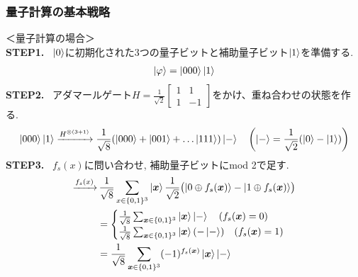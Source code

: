 \documentclass[9pt]{beamer}
\begin{document}
\begin{frame}
    \frametitle{量子計算の基本戦略}
    ＜量子計算の場合＞\\
    \textbf{STEP1.} \, $\ket{0}$に初期化された3つの量子ビットと補助量子ビット$\ket{1}$を準備する.
    \begin{align}
        \ket{\varphi} = \ket{000}\ket{1}
    \end{align}
    \textbf{STEP2.} \, アダマールゲート$H =\frac{1}{\sqrt{2}} \begin{bmatrix}1 & 1 \\ 1 & -1 \end{bmatrix}$をかけ、重ね合わせの状態を作る.
    \begin{align}
        \ket{000}\ket{1} \xrightarrow{H^{\otimes(3+1)}} \frac{1}{\sqrt{8}}(\ket{000} + \ket{001} + \ldots \ket{111}) \ket{-} \quad \left( \ket{-} = \frac{1}{\sqrt{2}}(\ket{0} - \ket{1}) \right)
    \end{align}
    \textbf{STEP3.} \, $f_s(x)$に問い合わせ, 補助量子ビットにmod 2で足す.\\
    \begin{align}
        \xrightarrow{f_s(x)} &\, \frac{1}{\sqrt{8}} \sum_{x \in \{0,1\}^3} \ket{\bm{x}} \frac{1}{\sqrt{2}} \bigl( \ket{0 \oplus f_s(\bm{x})} - \ket{1 \oplus f_s(\bm{x})} \bigr) \\
        &= \begin{cases}
            \frac{1}{\sqrt{8}} \sum_{\bm{x} \in \{0,1\}^3} \ket{\bm{x}} \ket{-} \quad (f_s(\bm{x}) = 0) \\
            \frac{1}{\sqrt{8}} \sum_{\bm{x} \in \{0,1\}^3} \ket{\bm{x}} (-\ket{-}) \quad (f_s(\bm{x}) = 1)
        \end{cases} \\
        &= \frac{1}{\sqrt{8}} \sum_{\bm{x} \in \{0,1\}^3} (-1)^{f_s(\bm{x})} \ket{\bm{x}} \ket{-}
    \end{align} 
\end{frame}
\end{document}
